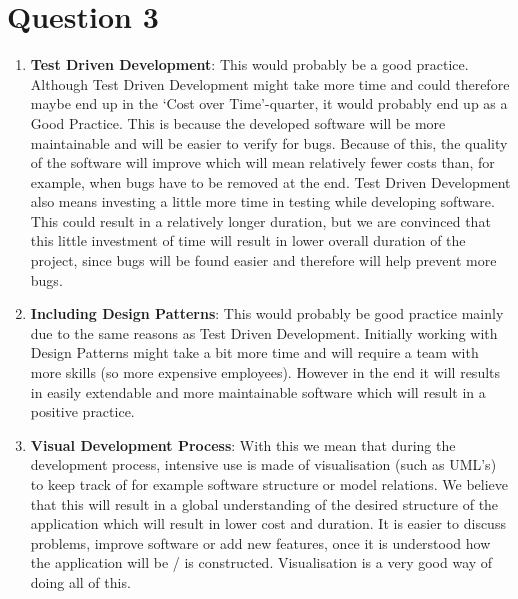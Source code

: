\section{Question 3}

\begin{enumerate}
	\item \textbf{Test Driven Development}: This would probably be a good practice. Although Test Driven Development might take more time and could therefore maybe end up in the `Cost over Time'-quarter, it would probably end up as a Good Practice. This is because the developed software will be more maintainable and will be easier to verify for bugs. Because of this, the quality of the software will improve which will mean relatively fewer costs than, for example, when bugs have to be removed at the end. Test Driven Development also means investing a little more time in testing while developing software. This could result in a relatively longer duration, but we are convinced that this little investment of time will result in lower overall duration of the project, since bugs will be found easier and therefore will help prevent more bugs. 
	\item \textbf{Including Design Patterns}: This would probably be good practice mainly due to the same reasons as Test Driven Development. Initially working with Design Patterns might take a bit more time and will require a team with more skills (so more expensive employees). However in the end it will results in easily extendable and more maintainable software which will result in a positive practice. 
	\item \textbf{Visual Development Process}: With this we mean that during the development process, intensive use is made of visualisation (such as UML's) to keep track of for example software structure or model relations. We believe that this will result in a global understanding of the desired structure of the application which will result in lower cost and duration. It is easier to discuss problems, improve software or add new features, once it is understood how the application will be / is constructed. Visualisation is a very good way of doing all of this. 
\end{enumerate}